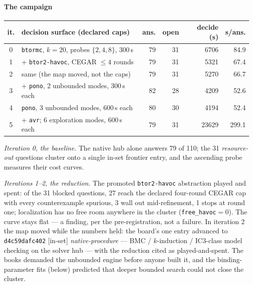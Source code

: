 \paragraph{The campaign}

\begin{center}
\footnotesize
\setlength{\tabcolsep}{2pt}
\begin{tabular}{@{}clrrrr@{}}
\toprule
it. & decision surface (declared caps) & ans. & open &
  decide (s) & s/ans. \\
\midrule
0 & \texttt{btormc}, $k{=}20$, probes $\{2,4,8\}$, 300\,s
  & 79 & 31 & 6706 & 84.9 \\
1 & \;+ \texttt{btor2-havoc}, CEGAR ${\leq}4$ rounds
  & 79 & 31 & 5321 & 67.4 \\
2 & same (the map moved, not the caps)
  & 79 & 31 & 5270 & 66.7 \\
3 & \;+ \texttt{pono}, 2 unbounded modes, 300\,s each
  & 82 & 28 & 4209 & 52.6 \\
4 & \;\texttt{pono}, 3 unbounded modes, 600\,s each
  & 80 & 30 & 4194 & 52.4 \\
5 & \;+ \texttt{avr}; 6 exploration modes, 600\,s each
  & 79 & 31 & 23629 & 299.1 \\
\bottomrule
\end{tabular}
\end{center}

\emph{Iteration 0, the baseline.} The native hub alone answers 79 of
110; the 31 \textit{resource-out} questions cluster onto a single
in-set frontier entry, and the ascending probe measures their cost
curves.

\emph{Iterations 1--2, the reduction.} The promoted
\texttt{btor2-havoc} abstraction played and spent: of the 31 blocked
questions, 27 reach the declared four-round CEGAR cap with every
counterexample spurious, 3 wall out mid-refinement, 1 stops at round
one; localization has no free room anywhere in the cluster
(\texttt{free\_havoc}${}=0$). The curve stays flat --- a finding, per
the pre-registration, not a failure. In iteration 2 the map moved
while the numbers held: the board's one entry advanced to
\texttt{d4c59dafc402} [in-set] \emph{native-procedure} --- BMC /
$k$-induction / IC3-class model checking on the solver hub --- with
the reduction cited as played-and-spent. The books demanded the
unbounded engine before anyone built it, and the binding-parameter
fits (below) predicted that deeper bounded search could not close
the cluster.

